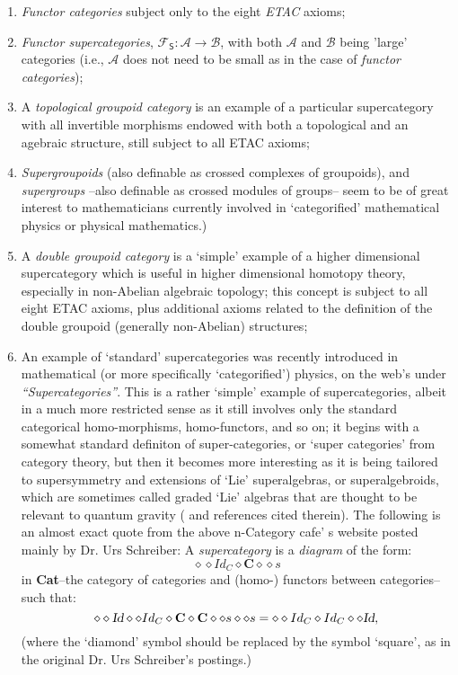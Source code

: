 \documentclass[12pt]{article}
\theoremstyle{plain}
\theoremstyle{definition}
\numberwithin{equation}{section}
\newcommand{\F}{\mathcal F}
\begin{document}
\begin{enumerate}

\item {\em Functor categories} subject only to the eight {\em ETAC} axioms;
\item {\em Functor supercategories}, $\mathsf{\F_S}: \mathcal{A} \to \mathcal{B}$,
      with both $\mathcal{A}$ and $\mathcal{B}$ being 'large' categories (i.e., 
      $\mathcal{A}$ does not need to be small as in the case of {\em functor categories});
\item A \emph{topological groupoid category} is an example of a particular supercategory
      with all invertible morphisms endowed with both a topological and an agebraic
      structure, still subject to all ETAC axioms;
\item \emph{Supergroupoids} (also definable as crossed complexes of groupoids), and \emph{supergroups} --also definable as crossed modules of groups-- seem to be of great interest to mathematicians currently involved in `categorified' mathematical physics or physical mathematics.) 
\item A \emph{double groupoid category} is a `simple' example of a higher dimensional supercategory which is useful in higher dimensional homotopy theory, especially in non-Abelian algebraic topology;
this concept is subject to all eight ETAC axioms, plus additional axioms related to the definition of the double groupoid (generally non-Abelian) structures;

\item 
An example of `standard' supercategories was recently introduced in mathematical (or more specifically `categorified') physics, on the web's  under \textit{``Supercategories''}. This is a rather `simple' example of supercategories, albeit in a much more restricted sense as it still involves only the standard categorical homo-morphisms, homo-functors, and so on; it begins with a somewhat standard definiton of super-categories, or `super categories' from category theory, but then it becomes more interesting as it is being tailored to supersymmetry and extensions of `Lie' superalgebras, or superalgebroids, which are sometimes called graded `Lie' algebras that are thought to be relevant to quantum gravity (\cite{BGB2} and references cited therein). The following is an almost exact quote from the above n-Category cafe' s website posted mainly by Dr. Urs Schreiber:  
A \textit{supercategory} is a \textit{diagram} of the form: 
 $$\diamond  \diamond Id_C \diamond \textbf{C} \diamond \diamond s $$ 
in \textbf{Cat}--the category of categories and (homo-) functors between categories-- such that: 
 $$\diamond  \diamond \textsl{Id} \diamond \diamond Id_C \diamond \textbf{C} \diamond \textbf{C}\diamond \diamond s \diamond \diamond s = \diamond  \diamond Id_C \diamond Id_C  \diamond  \diamond \textsl{Id},$$
(where the `diamond' symbol should be replaced by the symbol `square', as in the original Dr. Urs Schreiber's postings.) 


\end{enumerate}
\end{document}
